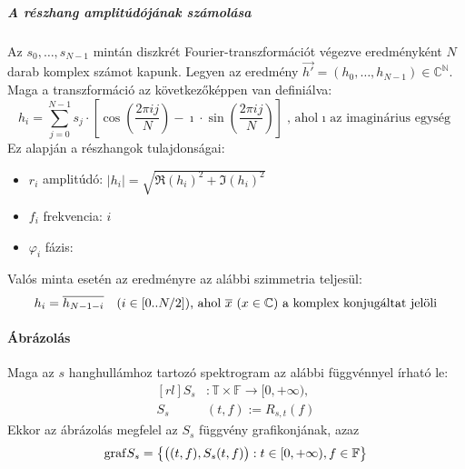 \subparagraph{A r\'eszhang amplit\'ud\'oj\'anak sz\'amol\'asa}
Az $s_0,\dots,s_{N-1}$ mint\'an diszkr\'et Fourier-transzform\'aci\'ot v\'egezve eredm\'enyk\'ent $N$ darab komplex sz\'amot kapunk. Legyen az eredm\'eny $\vec{h'}=(h_0,\dots,h_{N-1})\in\mathbb{C^N}$. 
Maga a transzform\'aci\'o az k\"ovetkez\H ok\'eppen van defini\'alva:
\[
h_i = \sum_{j=0}^{N-1} s_j \cdot \left[ \cos\left( \frac{2\pi i j}{N} \right) - \imath\cdot\sin\left( \frac{2\pi i j}{N} \right) \right] \text{, ahol $\imath$ az imagin\'arius egys\'eg}
\]
Ez alapj\'an a r\'eszhangok tulajdons\'agai:
\begin{itemize}
	\item $r_i$ amplit\'ud\'o: $|h_i|=\sqrt{\Re{(h_i)}^2 + \Im{(h_i)}^2}$
	\item $f_i$ frekvencia: $i$
	\item $\varphi_i$ f\'azis: 
\end{itemize}

Val\'os minta eset\'en az eredm\'enyre az al\'abbi szimmetria teljes\"ul:
\[
h_i = \overline{h_{N-1-i}} \quad (i\in\left[0..N/2\right])\text{, ahol $\overline{x}\ (x\in\mathbb C)$ a komplex konjug\'altat jel\"oli}
\]



\paragraph{\'Abr\'azol\'as}
Maga az $s$ hanghull\'amhoz tartoz\'o spektrogram az al\'abbi f\"uggv\'ennyel \'irhat\'o le:
\[ \begin{aligned}[rl]
S_s&:\mathbb{T}\times\mathbb{F} \rightarrow [0,+\infty), \\
S_s&(t,f):=R_{s,t}(f)
\end{aligned}
\]
Ekkor az \'abr\'azol\'as megfelel az $S_s$ f\"uggv\'eny grafikonj\'anak, azaz
\[
\mathrm{graf} S_s = \left\{ \big( (t,f) ,S_s(t,f) \big) : t\in [0,+\infty), f\in\mathbb{F} \right\}
\]

